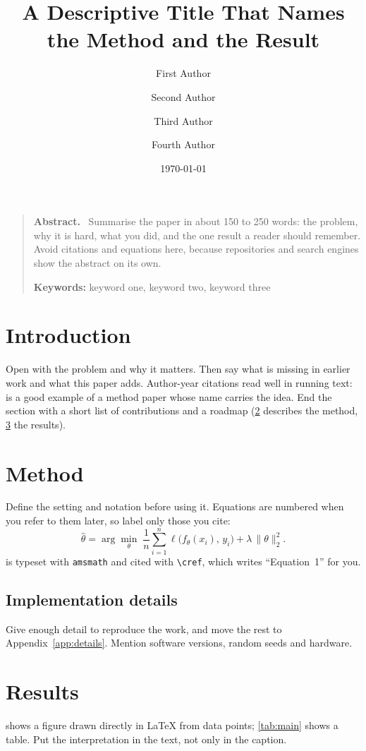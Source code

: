 \documentclass[11pt,a4paper]{article}
\title{\sffamily\bfseries A Descriptive Title That Names the Method and the Result}
\author[1,*]{First Author}
\author[1,2]{Second Author}
\author[2]{Third Author}
\author[3]{Fourth Author}
\affil[1]{Department of Computer Science, Example University, City, Country}
\affil[2]{Example Research Institute, City, Country}
\affil[3]{Independent researcher}
\affil[*]{Corresponding author: \texttt{first.author@example.org}}
\date{\today}
\renewenvironment{abstract}{\begin{quote}\small\noindent\textbf{\sffamily Abstract.}\ }%
  {\end{quote}}
\newcommand{\keywords}[1]{\par\smallskip\noindent\textbf{\sffamily Keywords:} #1}
\begin{document}
\maketitle
\thispagestyle{plain}

\begin{abstract}
Summarise the paper in about 150 to 250 words: the problem, why it is hard, what you did,
and the one result a reader should remember. Avoid citations and equations here, because
repositories and search engines show the abstract on its own.
\keywords{keyword one, keyword two, keyword three}
\end{abstract}

\section{Introduction}
Open with the problem and why it matters. Then say what is missing in earlier work
\citep{he2016,vaswani2017} and what this paper adds. Author-year citations read well
in running text: \citet{kingma2015} is a good example of a method paper whose name carries
the idea. End the section with a short list of contributions and a roadmap
(\cref{sec:method} describes the method, \cref{sec:results} the results).

\section{Method}\label{sec:method}
Define the setting and notation before using it. Equations are numbered when you refer to them
later, so label only those you cite:
\begin{equation}
  \hat{\theta} = \arg\min_{\theta}\; \frac{1}{n}\sum_{i=1}^{n} \ell\bigl(f_{\theta}(x_i),\, y_i\bigr)
  + \lambda\,\lVert\theta\rVert_2^2 .
  \label{eq:objective}
\end{equation}
 is typeset with \texttt{amsmath} and cited with \texttt{\textbackslash cref},
which writes ``Equation~1'' for you.

\subsection{Implementation details}
Give enough detail to reproduce the work, and move the rest to Appendix~\ref{app:details}.
Mention software versions, random seeds and hardware.

\section{Results}\label{sec:results}
 shows a figure drawn directly in \LaTeX{} from data points;
\cref{tab:main} shows a table. Put the interpretation in the text, not only in the caption.
\end{document}
